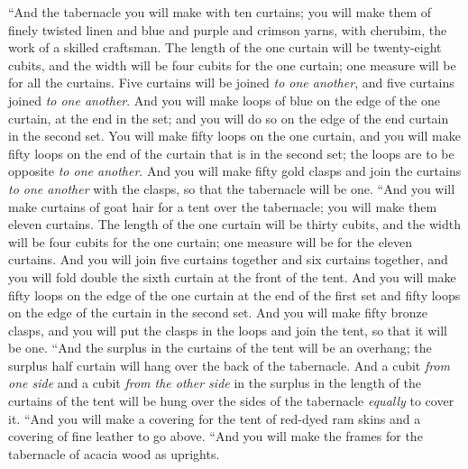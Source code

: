 \begin{biblechapter} %
 “And the tabernacle you will make with ten curtains; you will make them of finely twisted linen and blue and purple and crimson yarns, with cherubim, the work of a skilled craftsman.
\verse The length of the one curtain will be twenty-eight cubits, and the width will be four cubits for the one curtain; one measure will be for all the curtains.
\verse Five curtains will be joined \textit{to one another}, and five curtains joined \textit{to one another}.
\verse And you will make loops of blue on the edge of the one curtain, at the end in the set; and you will do so on the edge of the end curtain in the second set.
\verse You will make fifty loops on the one curtain, and you will make fifty loops on the end of the curtain that is in the second set; the loops are to be opposite \textit{to one another}.
\verse And you will make fifty gold clasps and join the curtains \textit{to one another} with the clasps, so that the tabernacle will be one.
\verse “And you will make curtains of goat hair for a tent over the tabernacle; you will make them eleven curtains.
\verse The length of the one curtain will be thirty cubits, and the width will be four cubits for the one curtain; one measure will be for the eleven curtains.
\verse And you will join five curtains together and six curtains together, and you will fold double the sixth curtain at the front of the tent.
\verse And you will make fifty loops on the edge of the one curtain at the end of the first set and fifty loops on the edge of the curtain in the second set.
\verse And you will make fifty bronze clasps, and you will put the clasps in the loops and join the tent, so that it will be one.
\verse “And the surplus in the curtains of the tent will be an overhang; the surplus half curtain will hang over the back of the tabernacle.
\verse And a cubit \textit{from one side} and a cubit \textit{from the other side} in the surplus in the length of the curtains of the tent will be hung over the sides of the tabernacle \textit{equally} to cover it.
\verse “And you will make a covering for the tent of red-dyed ram skins and a covering of fine leather to go above.
\verse “And you will make the frames for the tabernacle of acacia wood as uprights.

\end{biblechapter}

